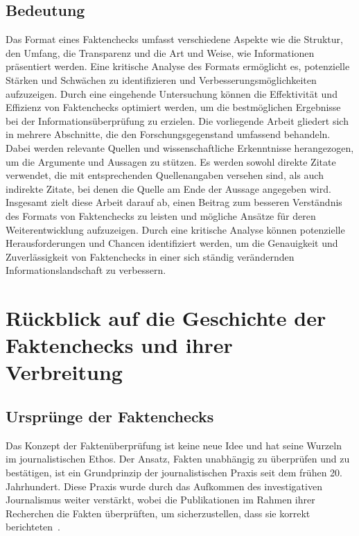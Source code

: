 \documentclass[a4paper,listof=totoc,bibliography=totoc]{scrartcl}
\begin{document}
\subsection{Bedeutung} 
Das Format eines Faktenchecks umfasst verschiedene Aspekte wie die Struktur, den 
Umfang, die Transparenz und die Art und Weise, wie Informationen präsentiert werden. 
Eine kritische Analyse des Formats ermöglicht es, potenzielle Stärken und Schwächen 
zu identifizieren und Verbesserungsmöglichkeiten aufzuzeigen. Durch eine eingehende 
Untersuchung können die Effektivität und Effizienz von Faktenchecks optimiert werden, 
um die bestmöglichen Ergebnisse bei der Informationsüberprüfung zu erzielen.
Die vorliegende Arbeit gliedert sich in mehrere Abschnitte, die den Forschungsgegenstand 
umfassend behandeln. Dabei werden relevante Quellen und wissenschaftliche Erkenntnisse 
herangezogen, um die Argumente und Aussagen zu stützen. Es werden sowohl direkte Zitate 
verwendet, die mit entsprechenden Quellenangaben versehen sind, als auch indirekte Zitate, 
bei denen die Quelle am Ende der Aussage angegeben wird.
Insgesamt zielt diese Arbeit darauf ab, einen Beitrag zum besseren Verständnis des Formats 
von Faktenchecks zu leisten und mögliche Ansätze für deren Weiterentwicklung aufzuzeigen. 
Durch eine kritische Analyse können potenzielle Herausforderungen und Chancen identifiziert 
werden, um die Genauigkeit und Zuverlässigkeit von Faktenchecks in einer sich ständig 
verändernden Informationslandschaft zu verbessern.

\section{Rückblick auf die Geschichte der Faktenchecks und ihrer Verbreitung}

\subsection{Ursprünge der Faktenchecks}

Das Konzept der Faktenüberprüfung ist keine neue Idee und hat seine Wurzeln im journalistischen 
Ethos. Der Ansatz, Fakten unabhängig zu überprüfen und zu bestätigen, ist ein Grundprinzip der 
journalistischen Praxis seit dem frühen 20. Jahrhundert. Diese Praxis wurde durch das Aufkommen 
des investigativen Journalismus weiter verstärkt, wobei die Publikationen im Rahmen ihrer Recherchen 
die Fakten überprüften, um sicherzustellen, dass sie korrekt berichteten~\cite{graves2018}. 
\end{document}
